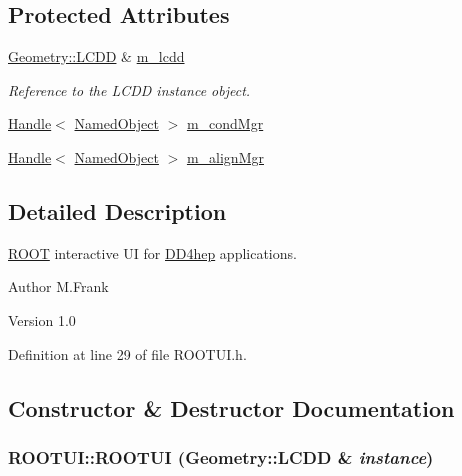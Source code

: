 \subsection*{Protected Attributes}
\begin{DoxyCompactItemize}
\item 
\hyperlink{class_d_d4hep_1_1_geometry_1_1_l_c_d_d}{Geometry::LCDD} \& \hyperlink{class_d_d4hep_1_1_r_o_o_t_u_i_a5ee50c37b731dbace8e02609727c937d}{m\_\-lcdd}
\begin{DoxyCompactList}\small\item\em Reference to the LCDD instance object. \item\end{DoxyCompactList}\item 
\hyperlink{class_d_d4hep_1_1_handle}{Handle}$<$ \hyperlink{class_d_d4hep_1_1_named_object}{NamedObject} $>$ \hyperlink{class_d_d4hep_1_1_r_o_o_t_u_i_aad76877df2fc04d079cf63b9898c123a}{m\_\-condMgr}
\item 
\hyperlink{class_d_d4hep_1_1_handle}{Handle}$<$ \hyperlink{class_d_d4hep_1_1_named_object}{NamedObject} $>$ \hyperlink{class_d_d4hep_1_1_r_o_o_t_u_i_a4e3cba5482c1e2fa75291a27437d039b}{m\_\-alignMgr}
\end{DoxyCompactItemize}


\subsection{Detailed Description}
\hyperlink{namespace_r_o_o_t}{ROOT} interactive UI for \hyperlink{namespace_d_d4hep}{DD4hep} applications. \begin{DoxyAuthor}{Author}
M.Frank 
\end{DoxyAuthor}
\begin{DoxyVersion}{Version}
1.0 
\end{DoxyVersion}


Definition at line 29 of file ROOTUI.h.

\subsection{Constructor \& Destructor Documentation}
\hypertarget{class_d_d4hep_1_1_r_o_o_t_u_i_ab1850fd130f80807ff936d85f307e3e0}{
\subsubsection[{ROOTUI}]{\setlength{\rightskip}{0pt plus 5cm}ROOTUI::ROOTUI ({\bf Geometry::LCDD} \& {\em instance})}}
\label{class_d_d4hep_1_1_r_o_o_t_u_i_ab1850fd130f80807ff936d85f307e3e0}


